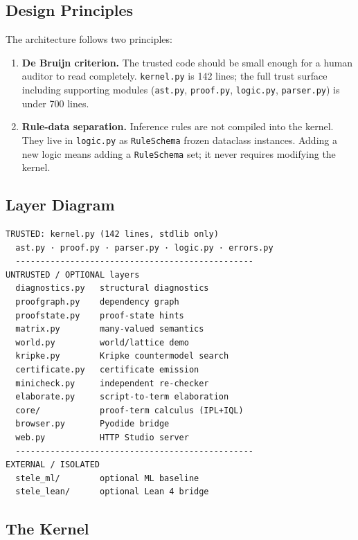 \documentclass[11pt,a4paper]{article}
\theoremstyle{definition}
\theoremstyle{plain}
\newcommand{\kernel}{\texttt{kernel.py}}
\begin{document}
\subsection{Design Principles}

The architecture follows two principles:

\begin{enumerate}
  \item \textbf{De Bruijn criterion.} The trusted code should be
        small enough for a human auditor to read completely.
        \kernel{} is 142 lines; the full trust surface including
        supporting modules (\texttt{ast.py}, \texttt{proof.py},
        \texttt{logic.py}, \texttt{parser.py}) is under 700 lines.

  \item \textbf{Rule-data separation.} Inference rules are not
        compiled into the kernel.
        They live in \texttt{logic.py} as \texttt{RuleSchema}
        frozen dataclass instances.
        Adding a new logic means adding a \texttt{RuleSchema}
        set; it never requires modifying the kernel.
\end{enumerate}

\subsection{Layer Diagram}

\begin{verbatim}
TRUSTED: kernel.py (142 lines, stdlib only)
  ast.py · proof.py · parser.py · logic.py · errors.py
  ------------------------------------------------
UNTRUSTED / OPTIONAL layers
  diagnostics.py   structural diagnostics
  proofgraph.py    dependency graph
  proofstate.py    proof-state hints
  matrix.py        many-valued semantics
  world.py         world/lattice demo
  kripke.py        Kripke countermodel search
  certificate.py   certificate emission
  minicheck.py     independent re-checker
  elaborate.py     script-to-term elaboration
  core/            proof-term calculus (IPL+IQL)
  browser.py       Pyodide bridge
  web.py           HTTP Studio server
  ------------------------------------------------
EXTERNAL / ISOLATED
  stele_ml/        optional ML baseline
  stele_lean/      optional Lean 4 bridge
\end{verbatim}

\subsection{The Kernel}
\end{document}
